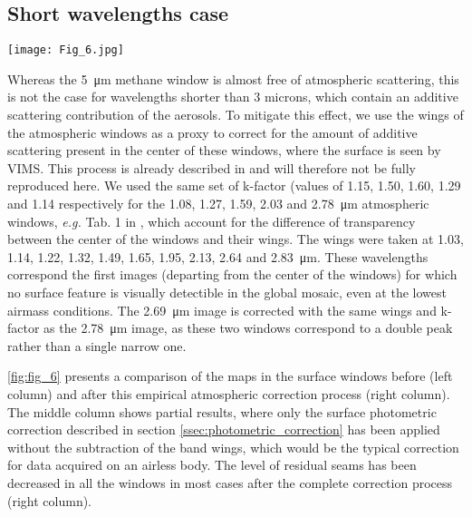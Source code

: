 \documentclass[preprint,twocolumn,5p,authoryear,compress,colorlinks=true]{elsarticle}
\newcommand{\figref}[1]{\autoref{fig:#1}}
\begin{document}
{\subsection{Short wavelengths case}

\begin{figure*}[!ht]
 \texttt{[image: Fig\_6.jpg]}
 \caption{Mosaics at \num{1.08}, \num{1.27}, \num{1.59}, \num{2.03}, \num{2.69}, \SI{2.78}{\um} without correction (left), with a photometric correction only (center), and with the first order correction of the additive scattering term prior to the photometric correction (right).}
 \label{fig:fig_6}
\end{figure*}

Whereas the \SI{5}{\um} methane window is almost free of atmospheric scattering, this is not the case for wavelengths shorter than 3 microns, which contain an additive scattering contribution of the aerosols. To mitigate this effect, we use the wings of the atmospheric windows as a proxy to correct for the amount of additive scattering present in the center of these windows, where the surface is seen by VIMS. This process is already described in \cite{LeMouelic2012a} and will therefore not be fully reproduced here. We used the same set of k-factor (values of \num{1.15}, \num{1.50}, \num{1.60}, \num{1.29} and \num{1.14} respectively for the \num{1.08}, \num{1.27}, \num{1.59}, \num{2.03} and \SI{2.78}{\um} atmospheric windows, \emph{e.g.} Tab. 1 in \cite{LeMouelic2012a}, which account for the difference of transparency between the center of the windows and their wings. The wings were taken at \num{1.03}, \num{1.14}, \num{1.22}, \num{1.32}, \num{1.49}, \num{1.65}, \num{1.95}, \num{2.13}, \num{2.64} and \SI{2.83}{\um}.
These wavelengths correspond the first images (departing from the center of the windows) for which no surface feature is visually detectible in the global mosaic, even at the lowest airmass conditions. The \SI{2.69}{\um} image is corrected with the same wings and k-factor as the \SI{2.78}{\um} image, as these two windows correspond to a double peak rather than a single narrow one.

\figref{fig_6} presents a comparison of the maps in the surface windows before (left column) and after this empirical atmospheric correction process (right column). The middle column shows partial results, where only the surface photometric correction described in section \ref{ssec:photometric_correction} has been applied without the subtraction of the band wings, which would be the typical correction for data acquired on an airless body. The level of residual seams has been decreased in all the windows in most cases after the complete correction process (right column).

}
\end{document}
